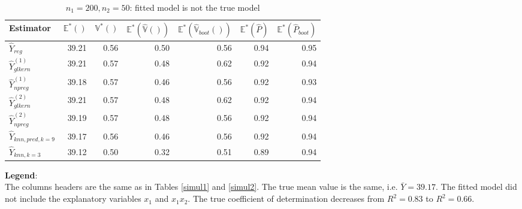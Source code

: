 \documentclass[a4paper,12pt,leqno, titlepage]{article}
\newcommand{\EX}{\mathbb{E}}
\newcommand{\VAR}{\mathbb{V}}
\begin{document}
\begin{table}[h]
\small
\centering
\caption{$n_1=200,n_2=50$: fitted model is not the true model }\label{simul4}\\[0.5cm]
\begin{tabular}{lrrrrrr}
  \hline
Estimator & $\EX^*()$ & $\VAR^*()$ & $\EX^*(\hat{\VAR}())$ & $\EX^*(\hat{\VAR}_{boot}())$ & $\EX^*(\hat{P})$ & $\EX^*(\hat{P}_{boot})$ \\ \hline\hline
$\hat{Y}_{reg}$              & 39.21 & 0.56 & 0.50 & 0.56      & 0.94 &  0.95\\ \hline
 $\hat{Y}^{(1)}_{glkern}$    & 39.21 & 0.57 & 0.48 & 0.62      & 0.92 &  0.94\\
 $\hat{Y}^{(1)}_{npreg}$     & 39.18 & 0.57 & 0.46 & 0.56      & 0.92 &  0.93   \\ \hline
 $\hat{Y}^{(2)}_{glkern}$    & 39.21 & 0.57 & 0.48 & 0.62      & 0.92 &  0.94\\
 $\hat{Y}^{(2)}_{npreg}$     & 39.19 & 0.57 & 0.48 & 0.56      & 0.92 &  0.94  \\ \hline
 $\hat{Y}_{knn,pred,k=9}$    & 39.17 & 0.56 & 0.46 & 0.56      & 0.92 &  0.94\\
 $\hat{Y}_{knn,k=3}$         & 39.12 & 0.50 & 0.32 & 0.51      & 0.89 &  0.94  \\ \hline \hline
\end{tabular}
\end{table}
\normalsize
\noindent\textbf{Legend}: \\
The columns headers are the same as in Tables \ref{simul1} and \ref{simul2}. The true mean value is the same, i.e. $\bar{Y}=39.17$. The fitted model did not include the explanatory variables $x_1$ and $x_1x_2$. The true coefficient of determination decreases from $R^2=0.83$ to $R^2=0.66$.
\newpage
\end{document}
